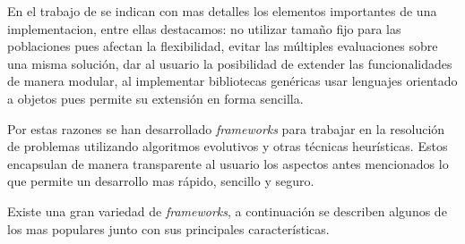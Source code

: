 En el trabajo de \citep{Alba1997} se indican con mas detalles los elementos importantes de una implementacion, entre ellas destacamos: no utilizar tamaño fijo para las poblaciones pues afectan la flexibilidad, evitar las múltiples evaluaciones sobre una misma solución, dar al usuario la posibilidad de extender las funcionalidades de manera modular, al implementar bibliotecas genéricas usar lenguajes orientado a objetos pues permite su extensión en forma sencilla.

Por estas razones se han desarrollado \emph{frameworks} para trabajar en la resolución de problemas utilizando algoritmos evolutivos y otras técnicas heurísticas. Estos encapsulan de manera transparente al usuario los aspectos antes mencionados lo que permite un desarrollo mas rápido, sencillo y seguro.

Existe una gran variedad de \emph{frameworks}, a continuación se describen algunos de los mas populares junto con sus principales características.

